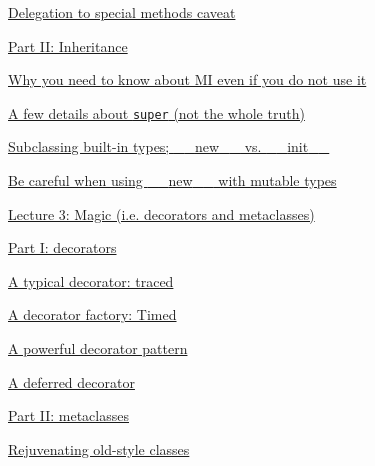 \documentclass[10pt,a4paper,english]{article}
\begin{document}
\begin{list}{}{}
\begin{list}{}{}
\begin{list}{}{}
\item {} \href{\#delegation-to-special-methods-caveat}{Delegation to special methods caveat}

\end{list}

\item {} \href{\#part-ii-inheritance}{Part II: Inheritance}
\begin{list}{}{}
\item {} \href{\#why-you-need-to-know-about-mi-even-if-you-do-not-use-it}{Why you need to know about MI even if you do not use it}

\item {} \href{\#a-few-details-about-super-not-the-whole-truth}{A few details about \texttt{super} (not the whole truth)}

\item {} \href{\#subclassing-built-in-types-new-vs-init}{Subclassing built-in types; {\_}{\_}new{\_}{\_} vs. {\_}{\_}init{\_}{\_}}

\item {} \href{\#be-careful-when-using-new-with-mutable-types}{Be careful when using {\_}{\_}new{\_}{\_} with mutable types}

\end{list}

\end{list}

\item {} \href{\#lecture-3-magic-i-e-decorators-and-metaclasses}{Lecture 3: Magic (i.e. decorators and metaclasses)}
\begin{list}{}{}
\item {} \href{\#part-i-decorators}{Part I: decorators}
\begin{list}{}{}
\item {} \href{\#a-typical-decorator-traced}{A typical decorator: traced}

\item {} \href{\#a-decorator-factory-timed}{A decorator factory: Timed}

\item {} \href{\#a-powerful-decorator-pattern}{A powerful decorator pattern}

\item {} \href{\#a-deferred-decorator}{A deferred decorator}

\end{list}

\item {} \href{\#part-ii-metaclasses}{Part II: metaclasses}
\begin{list}{}{}
\item {} \href{\#rejuvenating-old-style-classes}{Rejuvenating old-style classes}


\end{list}
\end{list}
\end{list}
\end{document}
